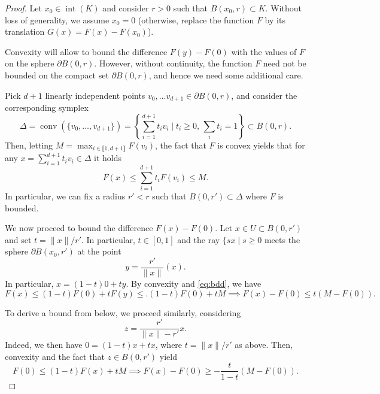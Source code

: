  \begin{proof}
     Let $x_0\in \operatorname{int}(K)$ and consider $r>0$ such that $B(x_0,r)\subset K$. Without loss of generality, we assume $x_0=0$ (otherwise, replace the function $F$ by its translation $G(x) = F(x)-F(x_0)$).
 
     Convexity will allow to bound the difference $F(y)-F(0)$ with the values of $F$ on the sphere $\partial B(0,r)$.
     However, without continuity, the function $F$ need not be bounded on the compact set $\partial B(0,r)$, and hence we need some additional care.
 
     Pick $d+1$ linearly independent points $v_0,\ldots v_{d+1}\in \partial B(0,r)$, and consider the corresponding symplex
     \begin{equation}
         \Delta = \operatorname{conv}\left(\{v_0,\ldots,v_{d+1}\}  \right)
         = \left\{  \sum_{i=1}^{d+1} t_i v_i \mid t_i\ge 0,\, \sum_i t_i=1 \right\}\subset B(0,r).
     \end{equation}
     Then, letting $M = \max_{i\in \llbracket1,d+1 \rrbracket} F(v_i)$, the fact that $F$ is convex yields that for any $x=\sum_{i=1}^{d+1} t_i v_i\in \Delta$ it holds
     \begin{equation}
         \label{eq:bdd}
         F(x) \le \sum_{i=1}^{d+1} t_i F(v_i) \le M.
     \end{equation}
     In particular, we can fix a radius $r'<r$ such that  $B(0,r')\subset \Delta$ where $F$ is bounded.
 
     We now proceed to bound the difference $F(x)-F(0)$.
     Let $x\in U\subset B(0,r')$ and set $t = \|x\|/r'$. In particular, $t\in [0,1]$ and the ray $\{sx\mid s\ge 0$ meets the sphere $\partial B(x_0,r')$ at the point
     \begin{equation}
         y= \frac{r'}{\|x\|}(x).
     \end{equation}
     In particular, $x=(1-t)0 + ty$. By convexity and \eqref{eq:bdd}, we have
     \begin{equation}
         \label{eq:upper}
         F(x) \le (1-t) F(0) + t F(y) \le. (1-t)F(0)+ t M
         \implies
         F(x)-F(0) \le t(M-F(0)).
     \end{equation}
 
     To derive a bound from below, we proceed similarly, considering
     \begin{equation}
         z = \frac{r'}{\|x\|-r'}x.
     \end{equation}
     Indeed, we then have $0 = (1-t)x + t x$, where $t=\|x\|/r'$ as above. Then, convexity and the fact that $z\in B(0,r')$ yield
     \begin{equation}
         \label{eq:lower}
         F(0)\le (1-t)F(x) +tM \implies F(x)-F(0)\ge -\frac{t}{1-t}(M-F(0)).
     \end{equation}
 

\end{proof}
